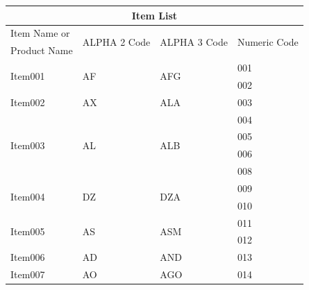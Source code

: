 \documentclass[12pt, a4paper]{article}
\begin{document}
	\begin{table}[b]
    \centering
    \begin{tabular}{|l||l|l|l|}
    \hline
    \multicolumn{4}{|c|}{Item List} \\ \hline
    Item Name or & \multirow{2}{*}{ALPHA 2 Code} & \multirow{2}{*}{ALPHA 3 Code} & \multirow{2}{*}{Numeric Code} \\ \cline{1-1}
    Product Name &  &  &  \\ \hline
    \multirow{2}{*}{Item001} & \multirow{2}{*}{AF} & \multirow{2}{*}{AFG} & 001 \\
    &  &  & 002 \\ \hline
    Item002 & AX & ALA & 003 \\ \hline
    \multirow{4}{*}{Item003} & \multirow{4}{*}{AL} & \multirow{4}{*}{ALB} & 004 \\
    &  &  & 005 \\
    &  &  & 006 \\
    &  &  & 008 \\ \hline
    \multirow{2}{*}{Item004} & \multirow{2}{*}{DZ} & \multirow{2}{*}{DZA} & 009 \\
    &  &  & 010 \\ \hline
    \multirow{2}{*}{Item005} & \multirow{2}{*}{AS} & \multirow{2}{*}{ASM} & 011 \\
    &  &  & 012 \\ \hline
    Item006 & AD & AND & 013 \\ \hline
    Item007 & AO & AGO & 014 \\ \hline \hline
    \end{tabular}
    \end{table}
    \pagebreak
\end{document}
